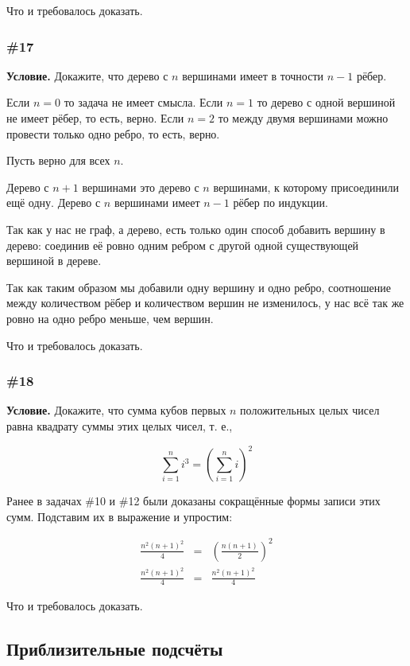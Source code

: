 \documentclass{article}
\begin{document}
Что и требовалось доказать.

\subsubsection{\#17}

\textbf{Условие.}
Докажите, что дерево с \(n\) вершинами имеет в точности \(n - 1\) рёбер.

Если \(n = 0\) то задача не имеет смысла.
Если \(n = 1\) то дерево с одной вершиной не имеет рёбер, то есть, верно.
Если \(n = 2\) то между двумя вершинами можно провести только одно ребро, то есть, верно.

Пусть верно для всех \(n\).

Дерево с \(n+1\) вершинами это дерево с \(n\) вершинами, к которому присоединили ещё одну.
Дерево с \(n\) вершинами имеет \(n-1\) рёбер по индукции.

Так как у нас не граф, а дерево, есть только один способ добавить вершину в дерево:
соединив её ровно одним ребром с другой одной существующей вершиной в дереве.

Так как таким образом мы добавили одну вершину и одно ребро,
соотношение между количеством рёбер и количеством вершин не изменилось,
у нас всё так же ровно на одно ребро меньше, чем вершин.

Что и требовалось доказать.

\subsubsection{\#18}

\textbf{Условие.}
Докажите, что сумма кубов первых \(n\) положительных целых чисел равна квадрату суммы этих целых чисел,
т. е.,

\begin{equation}
    \sum_{i=1}^n i^3 = \left(\sum_{i=1}^n i \right)^2
\end{equation}

Ранее в задачах \#10 и \#12 были доказаны сокращённые формы записи этих сумм.
Подставим их в выражение и упростим:

\begin{eqnarray}
    \frac{n^2(n+1)^2}{4} &=& \left( \frac{n(n+1)}{2} \right)^2\\
    \frac{n^2(n+1)^2}{4} &=& \frac{n^2(n+1)^2}{4}
\end{eqnarray}

Что и требовалось доказать.

\subsection{Приблизительные подсчёты}
\end{document}
